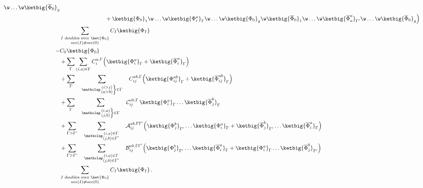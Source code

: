 \documentclass[a4paper,11pt]{article}
\begin{document}
\begin{equation}
\begin{split}
    \w \dots
    \w \ketbig{\overline{\Phi}_0}_g
    \\ & \Qquad
    {} + \ketbig{\Phi_0}_1
    \w \dots
    \w \ketbig{\Phi_{i}^{a}}_\irp
    \w \dots
    \w \ketbig{\Phi_0}_g
    \w \ketbig{\overline{\Phi}_0}_1
    \w \dots
    \w \ketbig{\overline{\Phi}_{a}^{a}}_\irpP
    \w \dots
    \w \ketbig{\overline{\Phi}_0}_g
    \Big)\\
    & \sum_{\substack{I\text{ doubles over }\ket{\Phi_0}\\\text{occ}(I) \ne \text{occ}(0)}}
    C_I \ketbig{\Phi_I}\\
    = & C_0 \ketbig{\Phi_0}\\
    & + \sum_\irp\sum_{(i,a) \in \irp} C_{i}^{a, \irp}
    \Big(
    \ketbig{\Phi_i^a}_\irp
    + \ketbig{\overline{\Phi}_i^a}_\irp
    \Big)\\
    & + \sum_\irp\sumijabrestr C_{ij}^{ab, \irp}
    \Big(
    \ketbig{\Phi_{ij}^{ab}}_\irp
    + \ketbig{\overline{\Phi}_{ij}^{ab}}_\irp
    \Big)\\
    & + \sum_\irp\sumijabfull\Dss_{ij}^{ab, \irp} \,
    \ketbig{\Phi_{i}^{a}}_\irp
    \dots
    \ketbig{\overline{\Phi}_{j}^{b}}_\irp\\
    & + \sum_{\irp > \irpP} \sumijabmix \Dmixaa_{ij}^{ab, \irp\irpP}
    \Big(
    \ketbig{\Phi_{j}^{b}}_\irpP
    \dots
    \ketbig{\Phi_{i}^{a}}_\irp
    + \ketbig{\overline{\Phi}_{j}^{b}}_\irpP
    \dots
    \ketbig{\overline{\Phi}_{i}^{a}}_\irp
    \Big)\\
    &  + \sum_{\irp > \irpP}\sumijabmix \Dmixab_{ij}^{ab, \irp\irpP}
    \Big(
    \ketbig{\Phi_{j}^{b}}_\irpP
    \dots
    \ketbig{\overline{\Phi}_{i}^{a}}_\irp
    + \ketbig{\Phi_{i}^{a}}_\irp
    \dots
    \ketbig{\overline{\Phi}_{j}^{b}}_\irpP
    \Big)\\
    & \sum_{\substack{I\text{ doubles over }\ket{\Phi_0}\\\text{occ}(I) \ne \text{occ}(0)}}
    C_I \ketbig{\Phi_I}\,.
  \end{split}
\end{equation}
\end{document}
